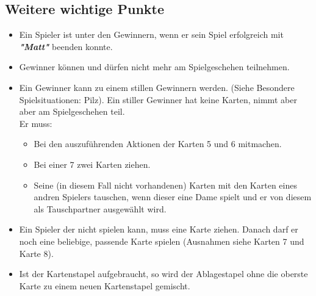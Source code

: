\documentclass{article}
\begin{document}
\subsection*{Weitere wichtige Punkte}
\begin{itemize}

\item Ein Spieler ist unter den Gewinnern, wenn er sein Spiel erfolgreich mit \textit{\textbf{"Matt"}} beenden konnte.

\item Gewinner können und dürfen nicht mehr am Spielgeschehen teilnehmen.

\item Ein Gewinner kann zu einem stillen Gewinnern werden. (Siehe Besondere Spielsituationen: Pilz). Ein stiller Gewinner hat keine Karten, nimmt aber aber am Spielgeschehen teil. \\

Er muss:
\begin{itemize}

\item Bei den auszuführenden Aktionen der Karten 5 und 6 mitmachen.

\item Bei einer 7 zwei Karten ziehen.

\item Seine (in diesem Fall nicht vorhandenen) Karten mit den Karten eines andren Spielers tauschen, wenn dieser eine Dame spielt und er von diesem als Tauschpartner ausgewählt wird.
\end{itemize}

\item Ein Spieler der nicht spielen kann, muss eine Karte ziehen. Danach darf er noch eine beliebige, passende Karte spielen (Ausnahmen siehe Karten 7 und Karte 8).

\item Ist der Kartenstapel aufgebraucht, so wird der Ablagestapel ohne die oberste Karte zu einem neuen Kartenstapel gemischt.
\end{itemize}
\end{document}
